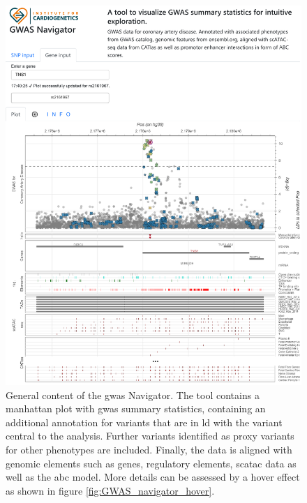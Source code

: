     \begin{figure}[H]
        \vspace*{-0.5cm}
        \capstart
        \centering
        \includegraphics{Abbildung/GWAS_navigator_screenshot.pdf}

        \begin{minipage}{\captionwidth}
            \caption[database]{\newline
            General content of the \ac{gwas} Navigator. The tool contains a manhattan plot with \ac{gwas} summary statistics, containing an additional annotation for variants that are in \ac{ld} with the variant central to the analysis. Further variants identified as proxy variants for other phenotypes are included. Finally, the data is aligned with genomic elements such as genes, regulatory elements, \ac{sc}\ac{atac} data as well as the \ac{abc} model. More details can be assessed by a hover effect as shown in figure \ref{fig:GWAS_navigator_hover}.}
            \label{fig:navigator}
        \end{minipage}
    \end{figure}

